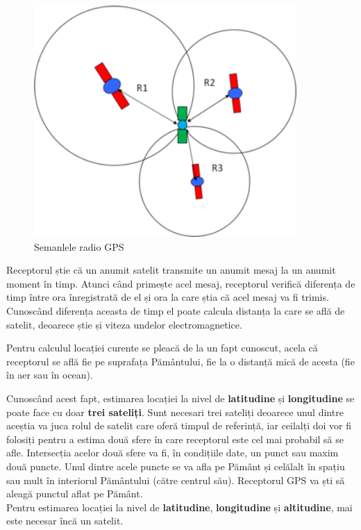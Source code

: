 \documentclass[12pt,a4paper]{article}
\begin{document}
\begin{figure}[h]
\centering
\includegraphics[width=10cm]{figures/gps_signals.png}
\caption{Semanlele radio GPS}
\label{fig:gps_signals}
\end{figure}

Receptorul știe că un anumit satelit transmite un anumit mesaj la un anumit moment în timp. Atunci când primește acel mesaj, receptorul verifică diferența de timp între ora înregistrată de el și ora la care știa că acel mesaj va fi trimis. Cunoscând diferența aceasta de timp el poate calcula distanța la care se află de satelit, deoarece știe și viteza undelor electromagnetice.

Pentru calculul locației curente se pleacă de la un fapt cunoscut, acela că receptorul se află fie pe suprafața Pământului, fie la o distanță mică de acesta (fie în aer sau în ocean).

Cunoscând acest fapt, estimarea locației la nivel de \textbf{latitudine} și \textbf{longitudine} se poate face cu doar \textbf{trei sateliți}. Sunt necesari trei sateliți deoarece unul dintre aceștia va juca rolul de satelit care oferă timpul de referință, iar ceilalți doi vor fi folosiți pentru a estima două sfere în care receptorul este cel mai probabil să se afle. Intersecția acelor două sfere va fi, în condițiile date, un punct sau maxim două puncte. Unul dintre acele puncte se va afla pe Pământ și celălalt în spațiu sau mult în interiorul Pământului (către centrul său). Receptorul GPS va ști să aleagă punctul aflat pe Pământ.\\

Pentru estimarea locației la nivel de \textbf{latitudine}, \textbf{longitudine} și \textbf{altitudine}, mai este necesar încă un satelit.
\end{document}
